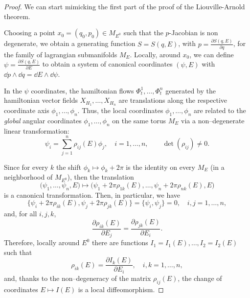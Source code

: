 \documentclass[english,fontsize=11pt,paper=b5]{scrbook}
\numberwithin{equation}{chapter}
\theoremstyle{definition}
\begin{document}
      \begin{proof}
        We can start mimicking the first part of the proof of the Liouville-Arnold theorem. %

        Choosing a point $x_0 = (q_0, p_0) \in M_{E^0}$ such that the $p$-Jacobian is non degenerate, we obtain a generating function $S=S(q,E)$, with $p = \frac{\partial S(q,E)}{\partial q}$, for the family of lagrangian submanifolds $M_E$.
        Locally, around $x_0$, we can define $\psi = \frac{\partial S(q,E)}{\partial E}$ to obtain a system of canonical coordinates $(\psi, E)$ with $\dd p\wedge\dd q = \dd E\wedge \dd \psi$.

        In the $\psi$ coordinates, the hamiltonian flows $\Phi_t^1, \ldots, \Phi_t^n$ generated by the hamiltonian vector fields $X_{H_1}, \ldots, X_{H_n}$ are translations along the respective coordinate axis $\phi_1, \ldots, \phi_n$.
        Thus, the local coordinates $\phi_1, \ldots, \phi_n$ are related to the \emph{global} angular coordinates $\phi_1, \ldots, \phi_n$ on the same torus $M_E$ via a non--degenerate linear transformation:
        \begin{equation}
          \psi_i = \sum_{j=1}^n \rho_{ij}(E)\phi_j, \quad i=1,\ldots,n, \qquad \det(\rho_{ij})\neq 0.
        \end{equation}

        Since for every $k$ the shift $\phi_k \mapsto \phi_k + 2\pi$ is the identity on every $M_E$ (in a neighborhood of $M_{E^0}$), then the translation
        \begin{equation}
          \big(\psi_1, \ldots, \psi_n, E\big) \mapsto \big(\psi_1 + 2\pi \rho_{1k}(E), \ldots, \psi_n + 2\pi \rho_{nk}(E), E\big)
        \end{equation}
        is a canonical transformation.
        Then, in particular, we have
        \begin{equation}
          \big\{
            \psi_i + 2\pi \rho_{ik}(E), \psi_j + 2\pi \rho_{jk}(E)
          \big\} = \big\{\psi_i, \psi_j\big\} = 0, \quad i,j = 1, \ldots, n,
        \end{equation}
        and, for all $i,j,k$,
        \begin{equation}
          \frac{\partial \rho_{ik}(E)}{\partial E_j}
          = \frac{\partial \rho_{jk}(E)}{\partial E_i}.
        \end{equation}
        Therefore, locally around $E^0$ there are functions $I_1 = I_1(E), \ldots, I_2 = I_2(E)$ such that
        \begin{equation}
          \rho_{ik}(E) = \frac{\partial I_k(E)}{\partial E_i}, \quad i,k=1,\ldots,n,
        \end{equation}
        and, thanks to the non--degeneracy of the matrix $\rho_{ij}(E)$, the change of coordinates $E \mapsto I(E)$ is a local diffeomorphism.


\end{proof}
\end{document}
